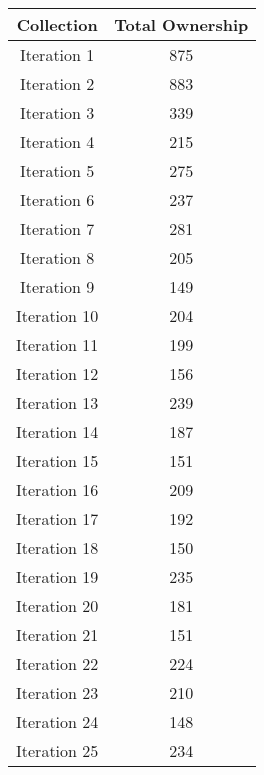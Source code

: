 \label{appendix:b}
\begin{center}
	
	\begin{tabular}{ | c | c |}
		\hline
		\textbf{Collection} & \textbf{Total Ownership} \\ \hline
		Iteration 1 &	875\\ \hline
		Iteration 2 &	883\\ \hline
		Iteration 3 &	339\\ \hline
		Iteration 4 &	215\\ \hline
		Iteration 5 &	275\\ \hline
		Iteration 6 &	237\\ \hline
		Iteration 7 &	281\\ \hline
		Iteration 8 &	205\\ \hline
		Iteration 9 &	149\\ \hline
		Iteration 10 &		204\\ \hline
		Iteration 11 &		199\\ \hline
		Iteration 12 &		156\\ \hline
		Iteration 13 &		239\\ \hline
		Iteration 14 &		187\\ \hline
		Iteration 15 &		151\\ \hline
		Iteration 16 &		209\\ \hline
		Iteration 17 &		192\\ \hline
		Iteration 18 &		150\\ \hline
		Iteration 19 &		235\\ \hline
		Iteration 20 &		181\\ \hline
		Iteration 21 &		151\\ \hline
		Iteration 22 &		224\\ \hline
		Iteration 23 &		210\\ \hline
		Iteration 24 &		148\\ \hline
		Iteration 25 &		234\\ \hline
		
	\end{tabular}
	 \label{table1}
\end{center}






	

